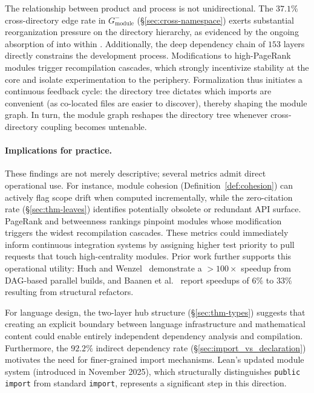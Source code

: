 The relationship between product and process is not unidirectional. The $37.1\%$ cross-directory edge rate in $G_{\mathrm{module}}^{-}$ (\S\ref{sec:cross-namespace}) exerts substantial reorganization pressure on the directory hierarchy, as evidenced by the ongoing absorption of  into  within . Additionally, the deep dependency chain of $153$ layers directly constrains the development process. Modifications to high-PageRank modules trigger recompilation cascades, which strongly incentivize stability at the core and isolate experimentation to the periphery. Formalization thus initiates a continuous feedback cycle: the directory tree dictates which imports are convenient (as co-located files are easier to discover), thereby shaping the module graph. In turn, the module graph reshapes the directory tree whenever cross-directory coupling becomes untenable.

\label{sec:practice}
\paragraph{Implications for practice.}
These findings are not merely descriptive; several metrics admit direct operational use. For instance, module cohesion (Definition~\ref{def:cohesion}) can actively flag scope drift when computed incrementally, while the zero-citation rate (\S\ref{sec:thm-leaves}) identifies potentially obsolete or redundant API surface. PageRank and betweenness rankings pinpoint modules whose modification triggers the widest recompilation cascades. These metrics could immediately inform continuous integration systems by assigning higher test priority to pull requests that touch high-centrality modules. Prior work further supports this operational utility: Huch and Wenzel~\cite{huch2024} demonstrate a ${>}100\times$ speedup from DAG-based parallel builds, and Baanen et al.~\cite{baanen2025} report speedups of $6\%$ to $33\%$ resulting from structural refactors.

For language design, the two-layer hub structure (\S\ref{sec:thm-types}) suggests that creating an explicit boundary between language infrastructure and mathematical content could enable entirely independent dependency analysis and compilation. Furthermore, the $92.2\%$ indirect dependency rate (\S\ref{sec:import_vs_declaration}) motivates the need for finer-grained import mechanisms. Lean's updated module system (introduced in November 2025), which structurally distinguishes \texttt{public import} from standard \texttt{import}, represents a significant step in this direction.

